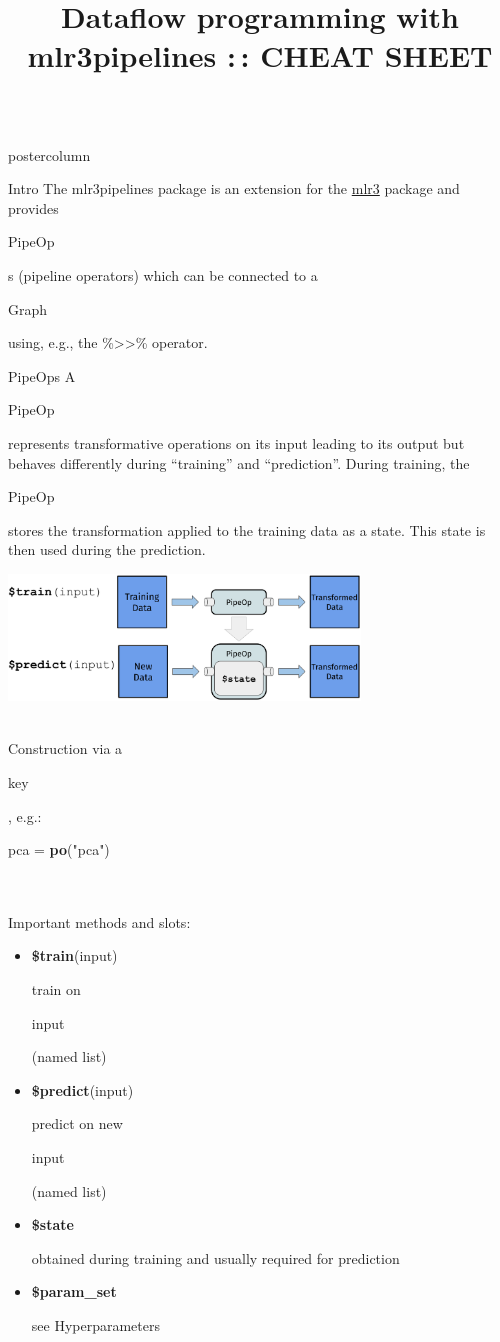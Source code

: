 \documentclass{beamer}
\title{Dataflow programming with mlr3pipelines :\,: CHEAT SHEET} %
\newlength{\columnheight} %
\newcommand{\codeinline}[1]{\begin{codeboxinline}#1\end{codeboxinline}}
\begin{document}
\begin{frame}[fragile]{}
	\begin{columns}
		\begin{column}{.245\textwidth}
			\begin{beamercolorbox}[center]{postercolumn}
				\begin{minipage}{.98\textwidth}
					\parbox[t][\columnheight]{\textwidth}{
						\begin{myblock}{Intro}
              The mlr3pipelines package is an extension for the \href{https://github.com/mlr-org/mlr3}{mlr3} package and provides \codeinline{PipeOp}s (pipeline operators) which can be connected to a \codeinline{Graph} using, e.g., the \%>{}>\% operator.
            \end{myblock}
						\begin{myblock}{PipeOps}
              A \codeinline{PipeOp} represents transformative operations on its input leading to its output but behaves differently during ``training'' and ``prediction''. During training, the \codeinline{PipeOp} stores the transformation applied to the training data as a state. This state is then used during the prediction.
              \begin{center}
                \includegraphics[width=0.7\textwidth]{img/po.pdf}
              \end{center}
              \ \\
              Construction via a \codeinline{key}, e.g.: \codeinline{pca = \textbf{po}("pca")} \\
              \ \\
              Important methods and slots:
              \begin{itemize}
                \item \codeinline{\textbf{\$train}(input)} train on \codeinline{input} (named list)
                \item \codeinline{\textbf{\$predict}(input)} predict on new \codeinline{input} (named list)
                \item \codeinline{\textbf{\$state}} obtained during training and usually required for prediction
                \item \codeinline{\textbf{\$param\_set}} see Hyperparameters

\end{itemize}
\end{myblock}}
\end{minipage}
\end{beamercolorbox}
\end{column}
\end{columns}
\end{frame}
\end{document}
